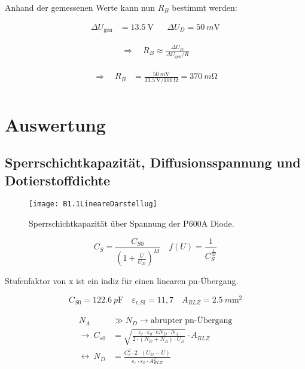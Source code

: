 \documentclass[
	a4paper, %
	12pt, %
]{CSUniSchoolLabReport}
\newcommand{\pico}{p}
\newcommand{\milli}{m}
\begin{document}
Anhand der gemessenen Werte kann nun $R_B$ bestimmt werden:

\begin{align*}
    \Delta U_{\text{gen}} &= \SI{13.5}{\volt} 
    && \Delta U_D = \SI{50}{\milli\volt}
\end{align*}

\begin{align*}
    \Rightarrow\quad 
    R_B \approx \frac{\Delta U_D}{\Delta U_{\text{gen}} / R}
\end{align*}

\begin{align*}
    \Rightarrow\quad 
    R_B &= \frac{\SI{50}{\milli\volt}}{\SI{13.5}{\volt} / \SI{100}\ohm}  =  \SI{370}{\milli\ohm} \\
\end{align*}

\vspace{1em}


\section{Auswertung}

\subsection{Sperrschichtkapazität, Diffusionsspannung und \\Dotierstoffdichte}

\begin{figure}[H] %
	\centering %
	\texttt{[image: B1.1LineareDarstellug]} %
	\caption{Sperrschichtkapazität über Spannung der P600A Diode.}
\end{figure}


\[
C_S = \frac{C_{S0}}{(1+\frac{U}{U_D})^M}\quad f(U) = \frac{1}{C_S^\frac{1}{M}}
\]

Stufenfaktor von x ist ein indiz für einen linearen pn-Übergang.

\vspace{1em} 


\[
C_{S0} = \SI{122,6}{\pico\farad} \quad \varepsilon_{\mathrm{r,Si}} = 11{,}7 \quad A_{RLZ} = \SI{2.5}{\milli\metre\squared}
\]

\begin{align*}
N_A &\gg N_D \rightarrow \text{abrupter pn-Übergang} \\
\rightarrow\ C_{s0} &= \sqrt{\frac{\varepsilon_r \cdot \varepsilon_0 \cdot e N_D \cdot N_A}{2 \cdot (N_D + N_A) \cdot U_D}} \cdot A_{RLZ} \\
\leftrightarrow\ N_D &= \frac{C_s^2 \cdot 2 \cdot (U_D - U)}{\varepsilon_r \cdot \varepsilon_0 \cdot A_{RLZ}^2}
\end{align*}
\end{document}
